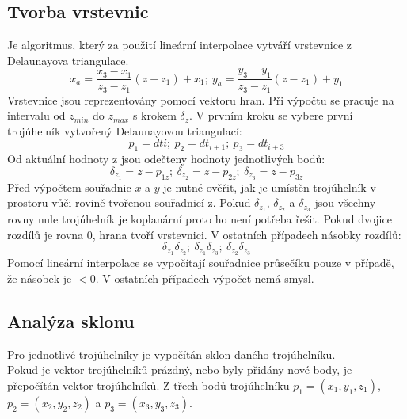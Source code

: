 \newpage
\subsection{Tvorba vrstevnic}
Je algoritmus, který za použití lineární interpolace vytváří vrstevnice z Delaunayova triangulace.\\

\hspace{-1.15cm}
\begin{equation}
    x_a = \frac{x_3-x_1}{z_3-z_1}(z-z_1)+x_1;~
    y_a = \frac{y_3-y_1}{z_3-z_1}(z-z_1)+y_1
\end{equation}
Vrstevnice jsou reprezentovány pomocí vektoru hran. Při výpočtu se pracuje na intervalu od $z_{min}$ do $z_{max}$ s krokem $\delta_z$. V prvním kroku se vybere první trojúhelník vytvořený Delaunayovou triangulací:
\begin{equation}
    p_1 = dt{i};~
    p_2 = dt_{i+1};~
    p_3 = dt_{i+3}
\end{equation}
Od aktuální hodnoty z jsou odečteny hodnoty jednotlivých bodů:
\begin{equation}
    \delta_{z_1} = z-p_{1z};~
    \delta_{z_2} = z-p_{2z};~
    \delta_{z_3} = z-p_{3z}
\end{equation}
Před výpočtem souřadnic $x$ a $y$ je nutné ověřit, jak je umístěn trojúhelník v prostoru vůči rovině tvořenou souřadnicí z. Pokud $\delta_{z_1}$, $\delta_{z_2}$ a $\delta_{z_3}$ jsou všechny rovny nule trojúhelník je koplanární proto ho není potřeba řešit. Pokud dvojice rozdílů je rovna 0, hrana tvoří vrstevnici. V ostatních případech násobky rozdílů:
\begin{equation}
    \delta_{z_1}\delta_{z_2};~
    \delta_{z_1}\delta_{z_3};~
    \delta_{z_2}\delta_{z_3}
\end{equation}
Pomocí lineární interpolace se vypočítají souřadnice průsečíku pouze v případě, že násobek je $< 0$. V ostatních případech výpočet nemá smysl.


\newpage

\subsection{Analýza sklonu}
Pro jednotlivé trojúhelníky je vypočítán sklon daného trojúhelníku.\\

\hspace{-1.15cm}
Pokud je vektor trojúhelníků prázdný, nebo byly přidány nové body, je přepočítán vektor trojúhelníků. Z třech bodů trojúhelníku  $p_1 = (x_1, y_1, z_1)$, $p_2 = (x_2, y_2, z_2)$ a $p_3 = (x_3, y_3, z_3)$.

